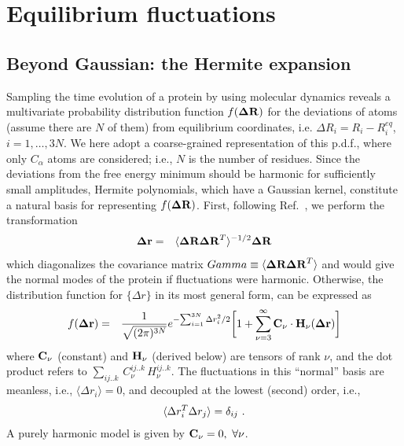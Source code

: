 \documentclass{article}
\begin{document}
\section{Equilibrium fluctuations}

\subsection{Beyond Gaussian: the Hermite expansion}
Sampling the time evolution of a protein by using molecular dynamics
reveals a multivariate probability distribution function $f({\bf\Delta
  R})$ for the deviations of atoms (assume there are $N$ of them) from
equilibrium coordinates, i.e. $\Delta R_i = R_i - R_i^{eq}$,
$i=1,\dots,3N$. We here adopt a coarse-grained representation of this
p.d.f., where only $C_\alpha$ atoms are considered; i.e., $N$ is the
number of residues. Since the deviations from the free energy minimum
should be harmonic for sufficiently small amplitudes, Hermite
polynomials, which have a Gaussian kernel, constitute a natural basis
for representing $f({\bf\Delta R})$. First, following
Ref.~\cite{Yogurtcu}, we perform the transformation
\begin{eqnarray}
\label{eq:rotation}
{\bf \Delta r} &=& \langle {\bf\Delta R \Delta R}^T\rangle ^{-1/2} {\bf
  \Delta R}
\end{eqnarray}
which diagonalizes the covariance matrix $
Gamma\equiv\langle {\bf\Delta R \Delta R}^T\rangle$  and would give the normal
modes of the protein if fluctuations were harmonic. Otherwise, the
distribution function for $\{\Delta r\}$ in its most general form, can
be expressed as~\cite{Flory}
\begin{eqnarray}
\label{hermite_expansion}
f({\bf\Delta r}) &=& \frac{1}{\sqrt{(2\pi)^{3N}}} e^{
    -{\sum_{i=1}^{3N} \Delta r_i^2}/2} \bigg[ 1 +  \sum_{\nu=3}^\infty
 {\bf C_\nu}\cdot {\bf H}_\nu({\bf \Delta r}) \bigg]
\end{eqnarray}
where ${\bf C}_\nu$ (constant) and ${\bf H}_\nu$ (derived below) are
tensors of rank $\nu$, and the dot product refers to
$\sum_{ij..k}\,C_\nu^{ij..k}\,H_\nu^{ij..k}$.  The fluctuations in
this ``normal'' basis are meanless, i.e., $\langle {\Delta r_i}\rangle
= 0$, and decoupled at the lowest (second) order, i.e.,
\begin{equation}
\langle {
\label{eqn:pair_corr}
  \Delta r_i^T \Delta r_j}\rangle = \delta_{ij}\ .
\end{equation}
A purely harmonic model is given by ${\bf C}_\nu = 0,\ \forall \nu$.
\end{document}
